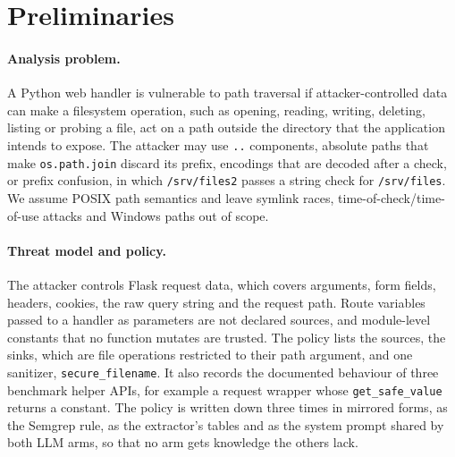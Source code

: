\section{Preliminaries}
\label{sec:prelim}

\paragraph{Analysis problem.}
A Python web handler is vulnerable to path traversal if attacker-controlled data can make a filesystem operation, such as opening, reading, writing, deleting, listing or probing a file, act on a path outside the directory that the application intends to expose. The attacker may use \texttt{..} components, absolute paths that make \texttt{os.path.join} discard its prefix, encodings that are decoded after a check, or prefix confusion, in which \texttt{/srv/files2} passes a string check for \texttt{/srv/files}. We assume POSIX path semantics and leave symlink races, time-of-check/time-of-use attacks and Windows paths out of scope.

\paragraph{Threat model and policy.}
The attacker controls Flask request data, which covers arguments, form fields, headers, cookies, the raw query string and the request path. Route variables passed to a handler as parameters are not declared sources, and module-level constants that no function mutates are trusted. The policy lists the sources, the sinks, which are file operations restricted to their path argument, and one sanitizer, \texttt{secure\_filename}. It also records the documented behaviour of three benchmark helper APIs, for example a request wrapper whose \texttt{get\_safe\_value} returns a constant. The policy is written down three times in mirrored forms, as the Semgrep rule, as the extractor's tables and as the system prompt shared by both LLM arms, so that no arm gets knowledge the others lack.

